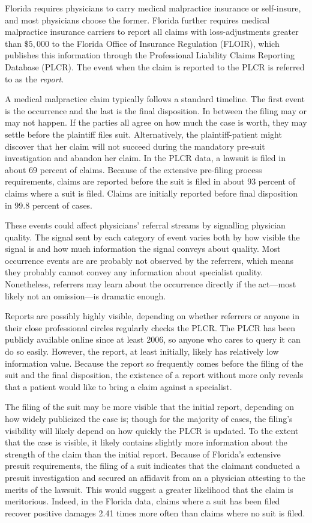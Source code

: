 \documentclass[
  12pt,
]{article}
\begin{document}
Florida requires physicians to carry medical malpractice insurance or self-insure, and most physicians choose the former. Florida further requires medical malpractice insurance carriers to report all claims with loss-adjustments greater than \(\$5,000\) to the Florida Office of Insurance Regulation (FLOIR), which publishes this information through the Professional Liability Claims Reporting Database (PLCR). The event when the claim is reported to the PLCR is referred to as the \emph{report}.

A medical malpractice claim typically follows a standard timeline. The first event is the occurrence and the last is the final disposition. In between the filing may or may not happen. If the parties all agree on how much the case is worth, they may settle before the plaintiff files suit. Alternatively, the plaintiff-patient might discover that her claim will not succeed during the mandatory pre-suit investigation and abandon her claim. In the PLCR data, a lawsuit is filed in about 69 percent of claims. Because of the extensive pre-filing process requirements, claims are reported before the suit is filed in about 93 percent of claims where a suit is filed. Claims are initially reported before final disposition in 99.8 percent of cases.

These events could affect physicians' referral streams by signalling physician quality. The signal sent by each category of event varies both by how visible the signal is and how much information the signal conveys about quality. Most occurrence events are are probably not observed by the referrers, which means they probably cannot convey any information about specialist quality. Nonetheless, referrers may learn about the occurrence directly if the act---most likely not an omission---is dramatic enough.

Reports are possibly highly visible, depending on whether referrers or anyone in their close professional circles regularly checks the PLCR. The PLCR has been publicly available online since at least 2006, so anyone who cares to query it can do so easily. However, the report, at least initially, likely has relatively low information value. Because the report so frequently comes before the filing of the suit and the final disposition, the existence of a report without more only reveals that a patient would like to bring a claim against a specialist.

The filing of the suit may be more visible that the initial report, depending on how widely publicized the case is; though for the majority of cases, the filing's visibility will likely depend on how quickly the PLCR is updated. To the extent that the case is visible, it likely contains slightly more information about the strength of the claim than the initial report. Because of Florida's extensive presuit requirements, the filing of a suit indicates that the claimant conducted a presuit investigation and secured an affidavit from an a physician attesting to the merits of the lawsuit. This would suggest a greater likelihood that the claim is meritorious. Indeed, in the Florida data, claims where a suit has been filed recover positive damages 2.41 times more often than claims where no suit is filed.
\end{document}
